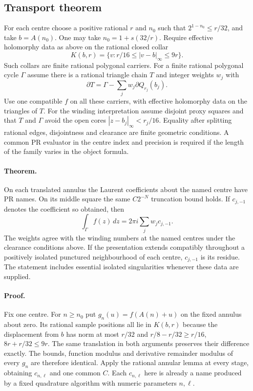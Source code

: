 \subsection{Transport theorem}

For each centre choose a positive rational $r$ and $n_0$ such that $2^{1-n_0}\le r/32$, and take $b=A(n_0)$. One may take $n_0=1+s(32/r)$. Require effective holomorphy data as above on the rational closed collar
\[
 K(b,r)=\{v:r/16\le |v-b|_\infty\le 9r\}.
\]
Such collars are finite rational polygonal carriers. For a finite rational polygonal cycle $\Gamma$ assume there is a rational triangle chain $T$ and integer weights $w_j$ with
\[
 \partial T=\Gamma-\sum_j w_j\partial Q_{r_j}(b_j).
\]
Use one compatible $f$ on all these carriers, with effective holomorphy data on the triangles of $T$. For the winding interpretation assume disjoint proxy squares and that $T$ and $\Gamma$ avoid the open cores $|z-b_j|_\infty<r_j/16$. Equality after splitting rational edges, disjointness and clearance are finite geometric conditions. A common PR evaluator in the centre index and precision is required if the length of the family varies in the object formula.

\paragraph{Theorem.} On each translated annulus the Laurent coefficients about the named centre have PR names. On its middle square the same $C2^{-N}$ truncation bound holds. If $c_{j,-1}$ denotes the coefficient so obtained, then
\[
             \int_\Gamma f(z)\,dz=2\pi i\sum_j w_j c_{j,-1}.
\]
The weights agree with the winding numbers at the named centres under the clearance conditions above. If the presentation extends compatibly throughout a positively isolated punctured neighbourhood of each centre, $c_{j,-1}$ is its residue. The statement includes essential isolated singularities whenever these data are supplied.

\paragraph{Proof.} Fix one centre. For $n\ge n_0$ put $g_n(u)=f(A(n)+u)$ on the fixed annulus about zero. Its rational sample positions all lie in $K(b,r)$ because the displacement from $b$ has norm at most $r/32$ and
$r/8-r/32\ge r/16$, $8r+r/32\le9r$. The same translation in both arguments preserves their difference exactly. The bounds, function modulus and derivative remainder modulus of every $g_n$ are therefore identical. Apply the rational annular lemma at every stage, obtaining $c_{n,\ell}$ and one common $C$. Each $c_{n,\ell}$ here is already a name produced by a fixed quadrature algorithm with numeric parameters $n,\ell$.

